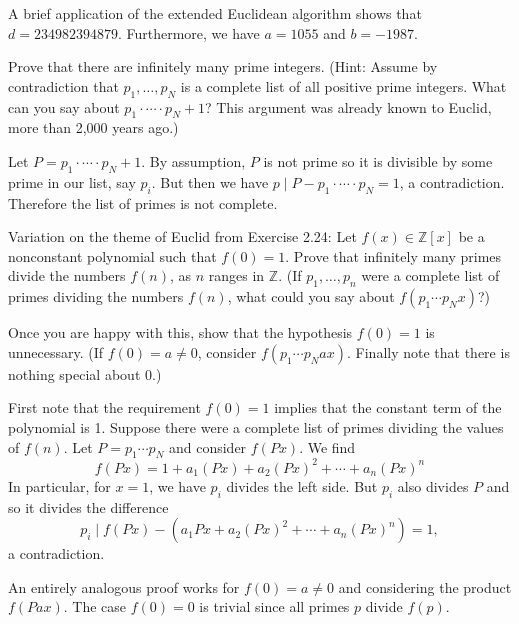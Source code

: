 \documentclass[../../master.tex]{subfiles}
\begin{document}
    \begin{solution}
        A brief application of the extended Euclidean algorithm shows that $d =
        234982394879$. Furthermore, we have $a = 1055$ and $b = -1987$.
    \end{solution}

    \begin{problem}
        Prove that there are infinitely many prime integers. (Hint: Assume by
        contradiction that $p_1, \ldots, p_N$ is a complete list of all positive
        prime integers. What can you say about $p_1 \cdot \cdots \cdot p_N + 1$?
        This argument was already known to Euclid, more than 2,000 years ago.)
    \end{problem}

    \begin{solution}
        Let $P = p_1 \cdot \cdots \cdot p_N + 1$. By assumption, $P$ is not
        prime so it is divisible by some prime in our list, say $p_i$. But then
        we have $p \mid P - p_1 \cdot \cdots \cdot p_N = 1$, a contradiction.
        Therefore the list of primes is not complete.
    \end{solution}

    \begin{problem}
        Variation on the theme of Euclid from Exercise 2.24: Let $f(x) \in
        \mathbb{Z}[x]$ be a nonconstant polynomial such that $f(0) = 1$. Prove
        that infinitely many primes divide the numbers $f(n)$, as $n$ ranges in
        $\mathbb{Z}$. (If $p_1, \ldots, p_n$ were a complete list of primes
        dividing the numbers $f(n)$, what could you say about $f(p_1 \cdots
        p_Nx)$?)

        Once you are happy with this, show that the hypothesis $f(0) = 1$ is
        unnecessary. (If $f(0) = a \neq 0$, consider $f(p_1 \cdots p_N ax)$.
        Finally note that there is nothing special about 0.)
    \end{problem}

    \begin{solution}
        First note that the requirement $f(0) = 1$ implies that the constant
        term of the polynomial is 1. Suppose there were a complete list of
        primes dividing the values of $f(n)$. Let $P = p_1 \cdots p_N$ and
        consider $f(Px)$. We find
        \[
            f(Px) = 1 + a_1(Px) + a_2 (Px)^2 + \cdots + a_n (Px)^{n}
        \] 
        In particular, for $x = 1$, we have $p_i$ divides the left side. But
        $p_i$ also divides $P$ and so it divides the difference
        \[
            p_i \mid f(Px) - (a_1 Px + a_2 (Px)^2 + \cdots + a_n (Px)^{n}) = 1,
        \] 
        a contradiction.

        An entirely analogous proof works for $f(0) = a \neq 0$ and considering
        the product $f(Pax)$. The case $f(0)
        = 0$ is trivial since all primes $p$ divide $f(p)$.
    \end{solution}
\end{document}
